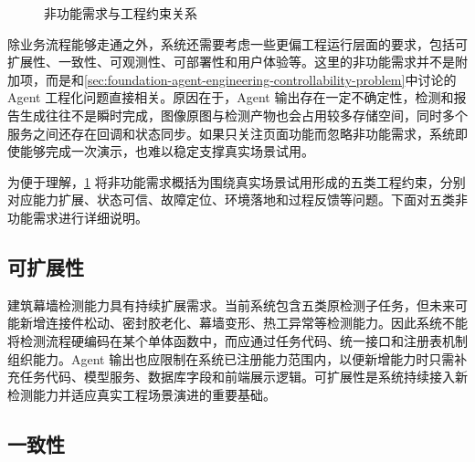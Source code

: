 \begin{figure}[!htb]
{%
  }
  \caption{非功能需求与工程约束关系}
  \label{fig:requirements-nonfunctional-requirements-overview}
\end{figure}

除业务流程能够走通之外，系统还需要考虑一些更偏工程运行层面的要求，包括可扩展性、一致性、可观测性、可部署性和用户体验等。这里的非功能需求并不是附加项，而是和\cref{sec:foundation-agent-engineering-controllability-problem}中讨论的 Agent 工程化问题直接相关。原因在于，Agent 输出存在一定不确定性，检测和报告生成往往不是瞬时完成，图像原图与检测产物也会占用较多存储空间，同时多个服务之间还存在回调和状态同步。如果只关注页面功能而忽略非功能需求，系统即使能够完成一次演示，也难以稳定支撑真实场景试用。

为便于理解，\cref{fig:requirements-nonfunctional-requirements-overview} 将非功能需求概括为围绕真实场景试用形成的五类工程约束，分别对应能力扩展、状态可信、故障定位、环境落地和过程反馈等问题。下面对五类非功能需求进行详细说明。

\subsection{可扩展性}
\label{subsec:requirements-scalability}

建筑幕墙检测能力具有持续扩展需求。当前系统包含五类原检测子任务，但未来可能新增连接件松动、密封胶老化、幕墙变形、热工异常等检测能力。因此系统不能将检测流程硬编码在某个单体函数中，而应通过任务代码、统一接口和注册表机制组织能力。Agent 输出也应限制在系统已注册能力范围内，以便新增能力时只需补充任务代码、模型服务、数据库字段和前端展示逻辑。可扩展性是系统持续接入新检测能力并适应真实工程场景演进的重要基础。

\subsection{一致性}
\label{subsec:requirements-consistency}


